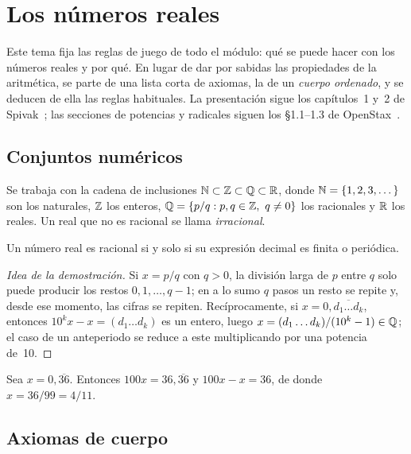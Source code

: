 \chapter{Los números reales}
\label{tema:1}

Este tema fija las reglas de juego de todo el módulo: qué se puede hacer con los números reales y por qué. En lugar de dar por sabidas las propiedades de la aritmética, se parte de una lista corta de axiomas, la de un \emph{cuerpo ordenado}, y se deducen de ella las reglas habituales. La presentación sigue los capítulos~1 y~2 de Spivak~\cite{spivak}; las secciones de potencias y radicales siguen los §1.1--1.3 de OpenStax~\cite{openstax}.

\section{Conjuntos numéricos}

Se trabaja con la cadena de inclusiones $\mathbb{N}\subset\mathbb{Z}\subset\mathbb{Q}\subset\mathbb{R}$, donde $\mathbb{N}=\{1,2,3,\dots\}$ son los naturales, $\mathbb{Z}$ los enteros, $\mathbb{Q}=\{p/q: p,q\in\mathbb{Z},\ q\neq 0\}$ los racionales y $\mathbb{R}$ los reales. Un real que no es racional se llama \emph{irracional}.

\begin{proposicion}\label{prop:decimal-periodico}
Un número real es racional si y solo si su expresión decimal es finita o periódica.
\end{proposicion}

\begin{proof}[Idea de la demostración]
Si $x=p/q$ con $q>0$, la división larga de $p$ entre $q$ solo puede producir los restos $0,1,\dots,q-1$; en a lo sumo $q$ pasos un resto se repite y, desde ese momento, las cifras se repiten. Recíprocamente, si $x=0{,}\overline{d_1\dots d_k}$, entonces $10^{k}x-x=(d_1\dots d_k)$ es un entero, luego $x=(d_1\dots d_k)/(10^{k}-1)\in\mathbb{Q}$; el caso de un anteperiodo se reduce a este multiplicando por una potencia de~10.
\end{proof}

\begin{ejemplo}\label{ej:periodico}
Sea $x=0{,}\overline{36}$. Entonces $100x=36{,}\overline{36}$ y $100x-x=36$, de donde $x=36/99=4/11$.
\end{ejemplo}

\section{Axiomas de cuerpo}

